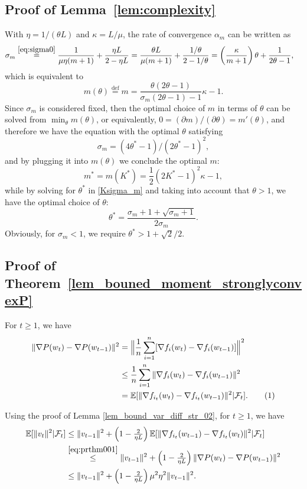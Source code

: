 \documentclass{article}
\newcommand\tagthis{\addtocounter{equation}{1}\tag{\theequation}}
\newcommand{\eqdef}{\stackrel{\text{def}}{=}}
\begin{document}
 

\subsection{Proof of Lemma~\ref{lem:complexity}}
 
 
With $\eta=1/(\theta L)$ and $\kappa=L/\mu$, the rate of convergence $\alpha_m$ can be written as
\begin{align*}
\sigma_m &\overset{\eqref{eq:sigma0}}{=} \frac{1}{\mu \eta (m + 1)} +  \frac{\eta L}{2 - \eta L}
= \frac{\theta L}{\mu(m+1)} + \frac{1/\theta}{2-1/\theta} 
   = \left(\frac{\kappa}{m+1}\right)\theta + \frac{1}{2\theta-1},
\end{align*}
which is equivalent to
$$m(\theta) \eqdef m = \frac{\theta(2\theta-1)}{\sigma_m (2\theta-1)-1} \kappa - 1.$$
Since $\sigma_m$ is considered fixed, then the optimal choice of $m$ in terms of $\theta$ can be solved from $\min_\theta m (\theta)$, or equivalently, $0 = (\partial m)/(\partial \theta) = m'(\theta)$, and therefore we have the equation with the optimal $\theta$ satisfying
\begin{equation}\label{Ksigma_m}
\sigma_m = (4\theta^*-1)/(2\theta^*-1)^2,
\end{equation}
and by plugging it into $m(\theta)$ we conclude the optimal $m$:
$$m^* = m(K^*) = \frac{1}{2}(2K^*-1)^2\kappa -1,$$
while by solving for $\theta^*$ in \eqref{Ksigma_m} and taking into account that $\theta>1$, we have the optimal choice of $\theta$:
$$\theta^* = \frac{\sigma_m+1+\sqrt{\sigma_m+1}}{2\sigma_m}.$$
Obviously, for $\sigma_m <1$, we require $\theta^* > 1+\sqrt{2}/2$.
 
 

\subsection{Proof of Theorem~\ref{lem_bouned_moment_stronglyconvexP}}

For $t \geq 1$, we have
\begin{align*}
\| \nabla P(w_{t}) - \nabla P(w_{t-1})\|^2 &= \Big\| \frac{1}{n} \sum_{i=1}^{n} [ \nabla f_i(w_{t}) - \nabla f_i(w_{t-1})  ] \Big\|^2 \\
& \leq \frac{1}{n} \sum_{i=1}^{n} \| \nabla f_i(w_{t}) - \nabla f_i(w_{t-1})  \|^2 \\
& = \mathbb{E}[ \| \nabla f_{i_{t}}(w_{t}) - \nabla f_{i_{t}}(w_{t-1}) \|^2 | \mathcal{F}_{t} ].  \tagthis \label{eq:prthm001}
\end{align*}

Using the proof of Lemma \ref{lem_bound_var_diff_str_02}, for $t \geq 1$, we have
\begin{align*}
 \mathbb{E}[\| v_{t} \|^2 | \mathcal{F}_{t}] 
& \leq \|v_{t-1} \|^2 + \left(1 - \tfrac{2}{\eta L}\right) \mathbb{E} [ \| \nabla f_{i_{t}}(w_{t-1}) - \nabla f_{i_{t}}(w_{t}) \|^2 | \mathcal{F}_{t} ] \\
& \overset{\eqref{eq:prthm001}}{\leq } \|v_{t-1} \|^2 + \left(1 - \tfrac{2}{\eta L}\right) \| \nabla P(w_{t}) - \nabla P(w_{t-1})\|^2 \\
& \leq \|v_{t-1} \|^2 + \left(1 - \tfrac{2}{\eta L}\right) \mu^2 \eta^2 \|v_{t-1}\|^2.
\end{align*}
\end{document}
